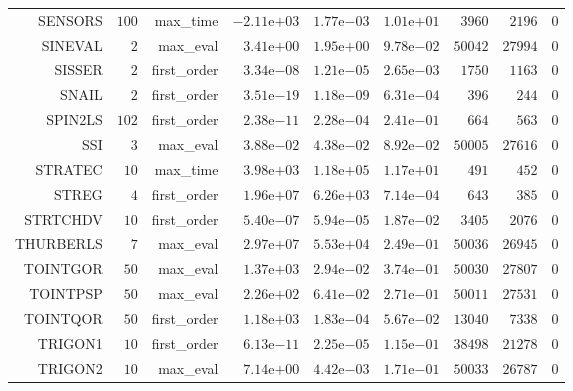 \begin{longtable}{rrrrrrrrr}
SENSORS & \(   100\) & max\_time & \(-2.11\)e\(+03\) & \( 1.77\)e\(-03\) & \( 1.01\)e\(+01\) & \(  3960\) & \(  2196\) & \(     0\) \\
SINEVAL & \(     2\) & max\_eval & \( 3.41\)e\(+00\) & \( 1.95\)e\(+00\) & \( 9.78\)e\(-02\) & \( 50042\) & \( 27994\) & \(     0\) \\
SISSER & \(     2\) & first\_order & \( 3.34\)e\(-08\) & \( 1.21\)e\(-05\) & \( 2.65\)e\(-03\) & \(  1750\) & \(  1163\) & \(     0\) \\
SNAIL & \(     2\) & first\_order & \( 3.51\)e\(-19\) & \( 1.18\)e\(-09\) & \( 6.31\)e\(-04\) & \(   396\) & \(   244\) & \(     0\) \\
SPIN2LS & \(   102\) & first\_order & \( 2.38\)e\(-11\) & \( 2.28\)e\(-04\) & \( 2.41\)e\(-01\) & \(   664\) & \(   563\) & \(     0\) \\
SSI & \(     3\) & max\_eval & \( 3.88\)e\(-02\) & \( 4.38\)e\(-02\) & \( 8.92\)e\(-02\) & \( 50005\) & \( 27616\) & \(     0\) \\
STRATEC & \(    10\) & max\_time & \( 3.98\)e\(+03\) & \( 1.18\)e\(+05\) & \( 1.17\)e\(+01\) & \(   491\) & \(   452\) & \(     0\) \\
STREG & \(     4\) & first\_order & \( 1.96\)e\(+07\) & \( 6.26\)e\(+03\) & \( 7.14\)e\(-04\) & \(   643\) & \(   385\) & \(     0\) \\
STRTCHDV & \(    10\) & first\_order & \( 5.40\)e\(-07\) & \( 5.94\)e\(-05\) & \( 1.87\)e\(-02\) & \(  3405\) & \(  2076\) & \(     0\) \\
THURBERLS & \(     7\) & max\_eval & \( 2.97\)e\(+07\) & \( 5.53\)e\(+04\) & \( 2.49\)e\(-01\) & \( 50036\) & \( 26945\) & \(     0\) \\
TOINTGOR & \(    50\) & max\_eval & \( 1.37\)e\(+03\) & \( 2.94\)e\(-02\) & \( 3.74\)e\(-01\) & \( 50030\) & \( 27807\) & \(     0\) \\
TOINTPSP & \(    50\) & max\_eval & \( 2.26\)e\(+02\) & \( 6.41\)e\(-02\) & \( 2.71\)e\(-01\) & \( 50011\) & \( 27531\) & \(     0\) \\
TOINTQOR & \(    50\) & first\_order & \( 1.18\)e\(+03\) & \( 1.83\)e\(-04\) & \( 5.67\)e\(-02\) & \( 13040\) & \(  7338\) & \(     0\) \\
TRIGON1 & \(    10\) & first\_order & \( 6.13\)e\(-11\) & \( 2.25\)e\(-05\) & \( 1.15\)e\(-01\) & \( 38498\) & \( 21278\) & \(     0\) \\
TRIGON2 & \(    10\) & max\_eval & \( 7.14\)e\(+00\) & \( 4.42\)e\(-03\) & \( 1.71\)e\(-01\) & \( 50033\) & \( 26787\) & \(     0\) \\

\end{longtable}
